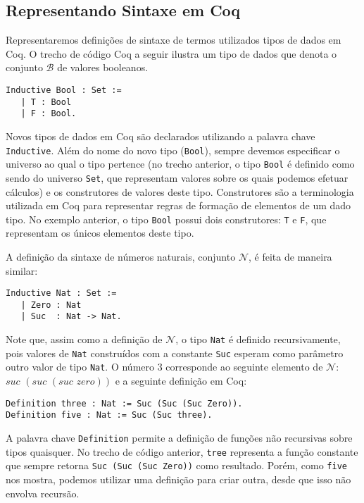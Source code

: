 \subsection{Representando Sintaxe em Coq}

Representaremos defini\c{c}\~oes de sintaxe de termos utilizados tipos de dados em Coq. O trecho de c\'odigo Coq a seguir ilustra um
tipo de dados que denota o conjunto $\mathcal{B}$ de valores booleanos.

\begin{lstlisting}
Inductive Bool : Set :=
   | T : Bool
   | F : Bool.
\end{lstlisting}

Novos tipos de dados em Coq s\~ao declarados utilizando a palavra chave \texttt{Inductive}. Al\'em do nome do novo tipo (\texttt{Bool}), sempre
devemos especificar o universo ao qual o tipo pertence (no trecho anterior, o tipo \texttt{Bool} \'e definido como sendo do universo 
\texttt{Set}, que representam valores sobre os quais podemos efetuar c\'alculos) e os construtores de valores deste tipo. Construtores s\~ao
a terminologia utilizada em Coq para representar regras de forma\c{c}\~ao de elementos de um dado tipo. No exemplo anterior, o tipo \texttt{Bool}
possui dois construtores: \texttt{T} e \texttt{F}, que representam os \'unicos elementos deste tipo.

A defini\c{c}\~ao da sintaxe de n\'umeros naturais, conjunto $\mathcal{N}$, \'e feita de maneira similar:
\begin{lstlisting}
Inductive Nat : Set :=
   | Zero : Nat
   | Suc  : Nat -> Nat.
\end{lstlisting}
Note que, assim como a defini\c{c}\~ao de $\mathcal{N}$, o tipo \texttt{Nat} \'e definido recursivamente, pois valores de \texttt{Nat} 
constru\'idos com a constante \texttt{Suc} esperam como par\^ametro outro valor de tipo \texttt{Nat}. O n\'umero $3$ corresponde ao seguinte
elemento de $\mathcal{N}$: $suc\,\,(suc\,\,(suc\,\,zero))$ e a seguinte defini\c{c}\~ao em Coq:
\begin{lstlisting}
Definition three : Nat := Suc (Suc (Suc Zero)).
Definition five : Nat := Suc (Suc three).
\end{lstlisting}
A palavra chave \texttt{Definition} permite a defini\c{c}\~ao de fun\c{c}\~oes n\~ao recursivas sobre tipos quaisquer. No trecho de c\'odigo
anterior, \texttt{tree} representa a fun\c{c}\~ao constante que sempre retorna \texttt{Suc (Suc (Suc Zero))} como resultado. Por\'em, como
\texttt{five} nos mostra, podemos utilizar uma defini\c{c}\~ao para criar outra, desde que isso n\~ao envolva recurs\~ao.


